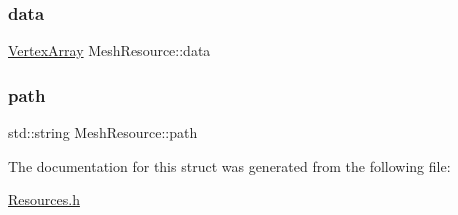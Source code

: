 \subsubsection{\texorpdfstring{data}{data}}
{\footnotesize\ttfamily \mbox{\hyperlink{class_vertex_array}{Vertex\+Array}} Mesh\+Resource\+::data}

\mbox{\label{struct_mesh_resource_a614a05a4784b5ab50bedbc676ff5b9a8}} 
\subsubsection{\texorpdfstring{path}{path}}
{\footnotesize\ttfamily std\+::string Mesh\+Resource\+::path}



The documentation for this struct was generated from the following file\+:\begin{DoxyCompactItemize}
\item 
\mbox{\hyperlink{_resources_8h}{Resources.\+h}}\end{DoxyCompactItemize}
